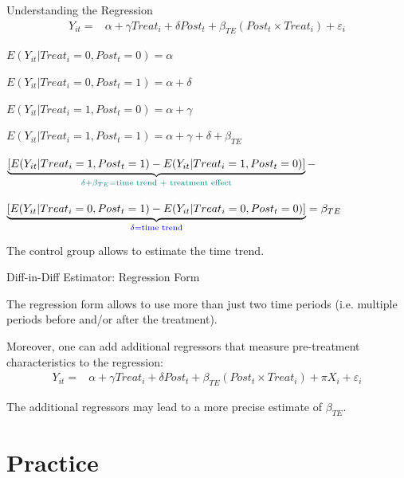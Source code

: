\documentclass[11pt, aspectratio = 169]{beamer}
\begin{document}
\begin{frame}{Understanding the Regression}
\begin{align*}
  Y_{it}=& \alpha + \gamma Treat_i + \delta Post_t + \beta_{TE} (Post_t \times Treat_i) + \varepsilon_i 
\end{align*}

$E(Y_{it}|Treat_i=0,Post_t=0)= \alpha$

$E(Y_{it}|Treat_i=0,Post_t=1)= \alpha + \delta$

$E(Y_{it}|Treat_i=1,Post_t=0)= \alpha + \gamma$

$E(Y_{it}|Treat_i=1,Post_t=1)= \alpha + \gamma  + \delta  + \beta_{TE}$
\small

\hspace{+0.25cm}$\underbrace{[E(Y_{it}|Treat_i=1,Post_t=1)-E(Y_{it}|Treat_i=1,Post_t=0)]}_{\color{teal} \delta + \beta_{TE} = \text{time trend + treatment effect}}-$

\hspace{+0.4cm}$\underbrace{[E(Y_{it}|Treat_i=0,Post_t=1)-E(Y_{it}|Treat_i=0,Post_t=0)]}_{ \color{blue} \delta = \text{time trend}}=\beta_{TE}$

The control group allows to estimate the time trend.
\end{frame}



\begin{frame}{Diff-in-Diff Estimator: Regression Form}

The regression form allows to use more than just two time periods (i.e. multiple periods before and/or after the treatment).

Moreover, one can add additional regressors that measure pre-treatment characteristics to the regression:
\begin{align*}
  Y_{it}=& \alpha + \gamma Treat_i + \delta Post_t + \beta_{TE} (Post_t \times Treat_i) + \pi X_i + \varepsilon_i 
\end{align*}

The additional regressors may lead to a more precise estimate of $\beta_{TE}$.

\end{frame}

\section{Practice}
\end{document}

